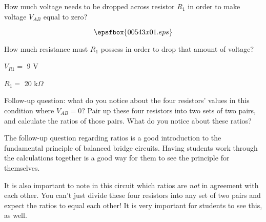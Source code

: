 

How much voltage needs to be dropped across resistor $R_1$ in order to make voltage $V_{AB}$ equal to zero?

$$\epsfbox{00543x01.eps}$$

How much resistance must $R_1$ possess in order to drop that amount of voltage?







$V_{R1} =$ 9 V

$R_1 =$ 20 k$\Omega$

\vskip 10pt

Follow-up question: what do you notice about the four resistors' values in this condition where $V_{AB} = 0$?  Pair up these four resistors into two sets of two pairs, and calculate the ratios of those pairs.  What do you notice about these ratios?







The follow-up question regarding ratios is a good introduction to the fundamental principle of balanced bridge circuits.  Having students work through the calculations together is a good way for them to see the principle for themselves.

It is also important to note in this circuit which ratios are {\it not} in agreement with each other.  You can't just divide these four resistors into any set of two pairs and expect the ratios to equal each other!  It is very important for students to see this, as well.




